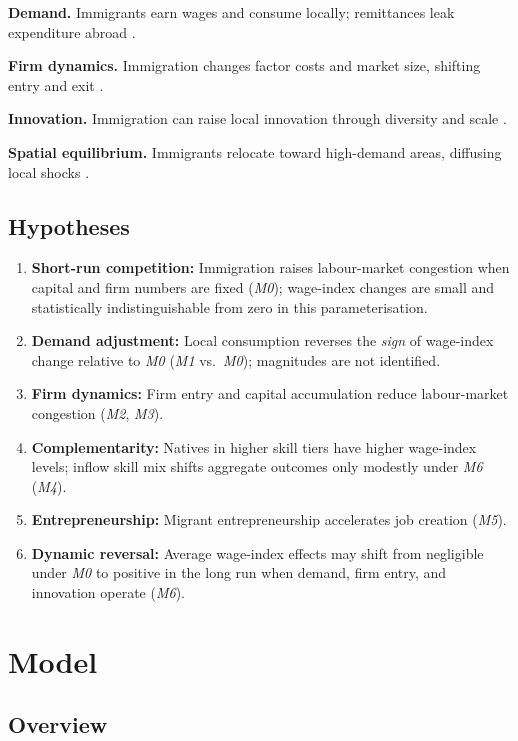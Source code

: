 \documentclass[11pt,a4paper]{article}
\begin{document}
\textbf{Demand.}
Immigrants earn wages and consume locally; remittances leak expenditure abroad \citep{cheremukhin2024}.

\textbf{Firm dynamics.}
Immigration changes factor costs and market size, shifting entry and exit \citep{waugh2018}.

\textbf{Innovation.}
Immigration can raise local innovation through diversity and scale \citep{terry2026}.

\textbf{Spatial equilibrium.}
Immigrants relocate toward high-demand areas, diffusing local shocks \citep{cadenakovak2016,monras2020}.

\subsection{Hypotheses}

\begin{enumerate}[label=\textbf{H\arabic*}. , nosep]
  \item \textbf{Short-run competition:} Immigration raises labour-market congestion when capital and firm numbers are fixed (\emph{M0}); wage-index changes are small and statistically indistinguishable from zero in this parameterisation.
  \item \textbf{Demand adjustment:} Local consumption reverses the \emph{sign} of wage-index change relative to \emph{M0} (\emph{M1} vs.\ \emph{M0}); magnitudes are not identified.
  \item \textbf{Firm dynamics:} Firm entry and capital accumulation reduce labour-market congestion (\emph{M2}, \emph{M3}).
  \item \textbf{Complementarity:} Natives in higher skill tiers have higher wage-index levels; inflow skill mix shifts aggregate outcomes only modestly under \emph{M6} (\emph{M4}).
  \item \textbf{Entrepreneurship:} Migrant entrepreneurship accelerates job creation (\emph{M5}).
  \item \textbf{Dynamic reversal:} Average wage-index effects may shift from negligible under \emph{M0} to positive in the long run when demand, firm entry, and innovation operate (\emph{M6}).
\end{enumerate}

\section{Model}
\label{sec:model}

\subsection{Overview}
\end{document}

